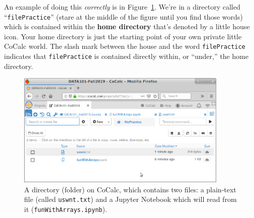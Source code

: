 
An example of doing this \textit{correctly} is in Figure~\ref{fig:folder}.
We're in a directory called ``\texttt{filePractice}'' (stare at the middle of
the figure until you find those words) which is contained within the
\textbf{home directory} that's denoted by a little house icon. Your home
directory is just the starting point of your own private little CoCalc world.
The slash mark between the house and the word \texttt{filePractice} indicates
that \texttt{filePractice} is contained directly within, or ``under,'' the home
directory.

\begin{figure}[ht]
\centering
\includegraphics[width=0.9\textwidth]{folder.png}
\medskip
\caption{A directory (folder) on CoCalc, which contains two files: a plain-text
file (called \texttt{uswnt.txt}) and a Jupyter Notebook which will read from it
(\texttt{funWithArrays.ipynb}).}
\label{fig:folder}
\end{figure}

\label{extensions}

